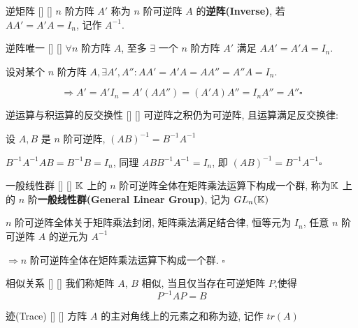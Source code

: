 \documentclass[UTF8]{ctexart}
\DeclareMathOperator{\0}{\mathbf{0}}
\DeclareMathOperator{\<}{\langle}
\renewcommand{\>}{\rangle}
\begin{document}
		\begin{dfn}
			[]
			{逆矩阵}
			[]
			[]
			 \(n\) 阶方阵 \(A'\) 称为 \(n\) 阶可逆阵 \(A\) 的\textbf{逆阵(Inverse)}, 若 \(AA'=A'A=I_n\), 记作 \(A^{-1}\). 
		\end{dfn}
		
		\begin{ppt}
			[]
			{逆阵唯一}
			[]
			[]
			 \(\forall n\) 阶方阵 \(A\), 至多 \(\exists\) 一个 \(n\) 阶方阵 \(A'\) 满足 \(AA'=A'A=I_n\). 
		\end{ppt}

        \begin{prf}
			设对某个 \(n\) 阶方阵 \(A, \exists A',A'': AA'=A'A=AA''=A''A=I_n\). 
			
			\[\Longrightarrow A'=A'I_n=A'(AA'')=(A'A)A''=I_nA''=A''\square\]
	    \end{prf}
 
		\begin{ppt}
			[]
			{逆运算与积运算的反交换性}
			[]
			[]
			可逆阵之积仍为可逆阵, 且运算满足反交换律: 
			
			设 \(A,B\) 是 \(n\) 阶可逆阵,  \((AB)^{-1}=B^{-1}A^{-1}\) 
		\end{ppt}
  
		\begin{prf}
             \(B^{-1}A^{-1}AB=B^{-1}B=I_n\), 同理 \(ABB^{-1}A^{-1}=I_n\), 即 \((AB)^{-1}=B^{-1}A^{-1}\square\) 
		\end{prf}
		
		
		\begin{ppt}
			[]
			{一般线性群}
			[]
			[]
			 \(\operatorname{\mathbb{K}}\) 上的 \(n\) 阶可逆阵全体在矩阵乘法运算下构成一个群, 称为 \(\operatorname{\mathbb{K}}\) 上的 \(n\) 阶\textbf{一般线性群(General Linear Group)}, 记为 \(GL_n(\operatorname{\mathbb{K}})\) 
		\end{ppt}
  
		\begin{prf}
			  \(n\) 阶可逆阵全体关于矩阵乘法封闭, 矩阵乘法满足结合律, 恒等元为 \(I_n\), 任意 \(n\) 阶可逆阵 \(A\) 的逆元为 \(A^{-1}\) 
			
			 \(\Longrightarrow n\) 阶可逆阵全体在矩阵乘法运算下构成一个群.  \(\square\) 
        \end{prf}
        
		\begin{dfn}
			[]
			{相似关系}
			[]
			[]
            我们称矩阵 \(A\), \(B\) 相似, 当且仅当存在可逆矩阵 \(P\),使得
            \[P^{-1}AP=B\]

		\end{dfn}
		
		\begin{dfn}
			[]
			{迹(Trace)}
			[]
			[]
            方阵 \(A\) 的主对角线上的元素之和称为迹, 记作 \(tr(A)\) 
		\end{dfn}
		
\end{document}
